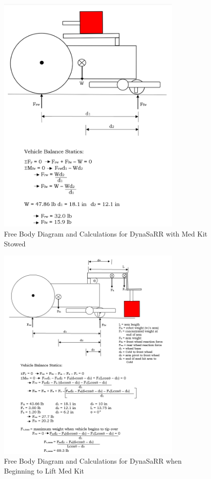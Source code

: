 \label{fig:analysis1_medkitstowed}
\begin{figure}[hp]
    \centering
    \includegraphics[width=0.8\textwidth]{Images/analysis1_medkitstowed.png}
    \caption{Free Body Diagram and Calculations for DynaSaRR with Med Kit Stowed}
    \label{fig:analysis1_medkitstowed}
\end{figure}
\vfill
\newpage

\label{fig:analysis2_liftingmedkit}
\begin{figure}[hp]
    \centering
    \includegraphics[width=0.8\textwidth]{Images/analysis2_liftingmedkit.png}
    \caption{Free Body Diagram and Calculations for DynaSaRR when Beginning to Lift Med Kit}
    \label{fig:analysis2_liftingmedkit}
\end{figure}
\vfill
\newpage


